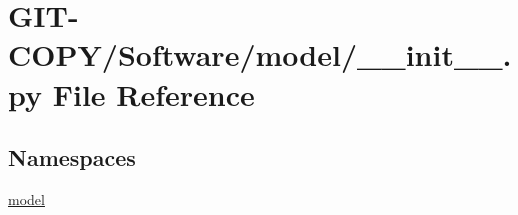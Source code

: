 \hypertarget{GIT-COPY_2Software_2model_2____init_____8py}{}\section{G\+I\+T-\/\+C\+O\+P\+Y/\+Software/model/\+\_\+\+\_\+init\+\_\+\+\_\+.py File Reference}
\label{GIT-COPY_2Software_2model_2____init_____8py}
\subsection*{Namespaces}
\begin{DoxyCompactItemize}
\item 
 \hyperlink{namespacemodel}{model}
\end{DoxyCompactItemize}
